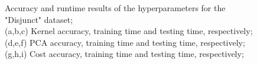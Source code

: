 \documentclass[conference]{IEEEtran}
\begin{document}
\begin{figure}[ht!]
    \quad
    \quad
    \quad

    \caption{
        \color{maxim}
        Accuracy and runtime results of the hyperparameters for the "Disjunct" dataset; \\ 
        (a,b,c) Kernel accuracy, training time and testing time, respectively; (d,e,f) PCA accuracy, training time and testing time, respectively; (g,h,i) Cost accuracy, training time and testing time, respectively;
    }
    \label{fig:hyper:svm_param_allin}
\end{figure}
\end{document}
